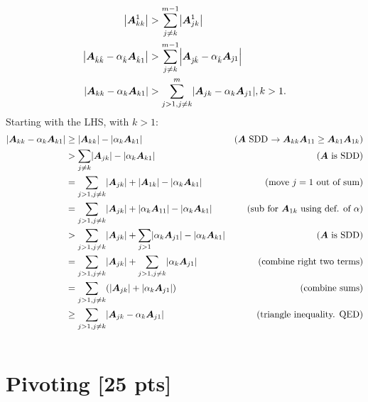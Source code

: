 \documentclass[twoside,10pt]{article}
\begin{document}
\begin{enumerate}
  \begin{align*}
    \left|\mtx{A}^1_{kk}\right| &> \sum \limits_{j \neq k}^{m-1} \left|\mtx{A}^1_{jk}\right|\\
    \left|\mtx{A}_{\Y\Y} - \alpha_{\Y}\mtx{A}_{\Y1}\right| &> \sum_{j \neq k}^{m-1}\left|\mtx{A}_{\J\Y} - \alpha_{\Y} \mtx{A}_{\J 1}\right|\\
    \left|\mtx{A}_{kk} - \alpha_{k}\mtx{A}_{k1}\right| &> \sum_{j > 1, j \neq k}^{m}\left|\mtx{A}_{jk} - \alpha_{k} \mtx{A}_{j 1}\right|, k > 1.
  \end{align*}
  Starting with the LHS, with $k > 1$:
  \begin{align*}
    \left|\mtx{A}_{k k} - \alpha_k \mtx{A}_{k 1}\right| &\geq \left|\mtx{A}_{kk}\right| - \left|\alpha_k\mtx{A}_{k1}\right|&\text{($\mtx{A}$ SDD $\to \mtx{A}_{kk}\mtx{A}_{11} \geq \mtx{A}_{k1}\mtx{A}_{1k}$)}\\
    &> \sum_{j \neq k}\left|\mtx{A}_{j k}\right| - \left|\alpha_k\mtx{A}_{k 1}\right|&\text{($\mtx{A}$ is SDD)}\\
    &= \sum_{j > 1, j \neq k}\left|\mtx{A}_{j k}\right|+\left|\mtx{A}_{1 k}\right| - \left|\alpha_k\mtx{A}_{k 1}\right|&\text{(move $j = 1$ out of sum)}\\
    &= \sum_{j > 1, j \neq k}\left|\mtx{A}_{j k}\right|+\left|\alpha_k\mtx{A}_{1 1}\right| - \left|\alpha_k\mtx{A}_{k 1}\right|&\text{(sub for $\mtx{A}_{1k}$ using def. of $\alpha$)}\\
    &> \sum_{j > 1, j \neq k}\left|\mtx{A}_{j k}\right|+\sum_{j > 1}\left|\alpha_k\mtx{A}_{j 1}\right| - \left|\alpha_k\mtx{A}_{k 1}\right|&\text{($\mtx{A}$ is SDD)}\\
    &= \sum_{j > 1, j \neq k}\left|\mtx{A}_{j k}\right|+\sum_{j > 1, j \neq k}\left|\alpha_k\mtx{A}_{j 1}\right|&\text{(combine right two terms)}\\
    &= \sum_{j > 1, j \neq k}\left(\left|\mtx{A}_{j k}\right| + \left|\alpha_k\mtx{A}_{j 1}\right|\right)&\text{(combine sums)}\\
    &\geq \sum_{j > 1, j \neq k}\left|\mtx{A}_{j k} - \alpha_k\mtx{A}_{j 1}\right|&\text{(triangle inequality. QED)}
  \end{align*}
  \begin{align*}
  \end{align*}
\end{enumerate}

\section{Pivoting [25 pts]}
\end{document}
